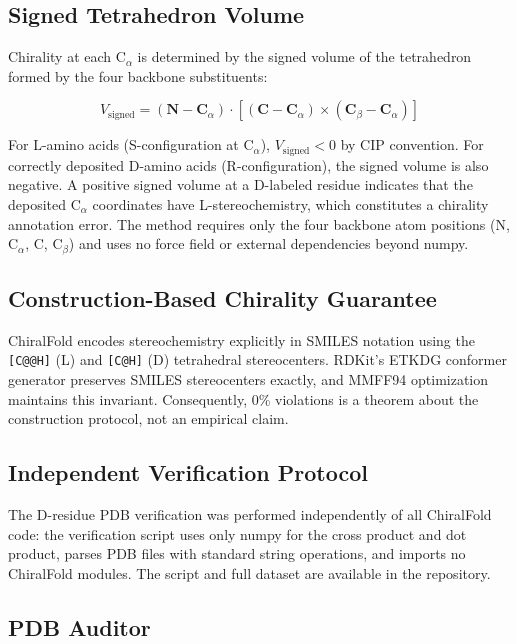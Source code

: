 \documentclass[11pt]{article}
\begin{document}
\subsection{Signed Tetrahedron Volume}

Chirality at each C$_\alpha$ is determined by the signed volume of the
tetrahedron formed by the four backbone substituents:

\begin{equation}
V_\text{signed} = (\mathbf{N} - \mathbf{C}_\alpha) \cdot
  \left[ (\mathbf{C} - \mathbf{C}_\alpha)
         \times (\mathbf{C}_\beta - \mathbf{C}_\alpha) \right]
\label{eq:vol}
\end{equation}

For L-amino acids (S-configuration at C$_\alpha$), $V_\text{signed} < 0$
by CIP convention. For correctly deposited D-amino acids (R-configuration),
the signed volume is also negative. A positive signed volume at a
D-labeled residue indicates that the deposited C$_\alpha$ coordinates have
L-stereochemistry, which constitutes a chirality annotation error. The method requires
only the four backbone atom positions (N, C$_\alpha$, C, C$_\beta$) and
uses no force field or external dependencies beyond numpy.

\subsection{Construction-Based Chirality Guarantee}

ChiralFold encodes stereochemistry explicitly in SMILES notation using the
\texttt{[C@@H]} (L) and \texttt{[C@H]} (D) tetrahedral stereocenters.
RDKit's ETKDG conformer generator preserves SMILES stereocenters exactly,
and MMFF94 optimization maintains this invariant. Consequently,
0\% violations is a theorem about the construction protocol, not an
empirical claim.

\subsection{Independent Verification Protocol}

The D-residue PDB verification was performed independently of all
ChiralFold code: the verification script uses only numpy for the cross
product and dot product, parses PDB files with standard string operations,
and imports no ChiralFold modules. The script and full dataset are
available in the repository.

\subsection{PDB Auditor}
\end{document}
